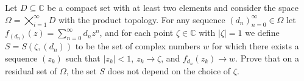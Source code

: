 Let $D\subseteq \mathbb{C}$ be a compact set with at least two elements and consider the space $\Omega=\bigtimes_{i=1}^{\infty} D$ with the product topology. For any sequence $(d_n)_{n=0}^{\infty} \in \Omega$ let $f_{(d_n)}(z)=\sum_{n=0}^{\infty}d_nz^n$, and for each point $\zeta \in \mathbb{C}$ with $|\zeta|=1$ we define $S=S(\zeta,(d_n))$ to be the set of complex numbers $w$ for which there exists a sequence $(z_k)$ such that $|z_k|<1$, $z_k \to \zeta$, and $f_{d_n}(z_k) \to w$. Prove that on a residual set of $\Omega$, the set $S$ does not depend on the choice of $\zeta$.